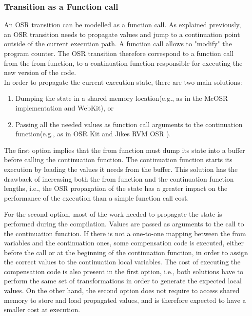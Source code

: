 \subsubsection{Transition as a Function call}
An OSR transition can be modelled as a function call.
As explained previously, an OSR transition needs to propagate values and jump to a continuation point outside of the current execution path.
A function call allows to "modify" the program counter.
The OSR transition therefore correspond to a function call from the from function, to a continuation function responsible for executing the new version of the code.\\

In order to propagate the current execution state, there are two main solutions: 
\begin{enumerate}
    \item Dumping the state in a shared memory location(e.g., as in the McOSR implementation\cite{lameed2013modular} and WebKit\cite{WebKitURL}), or
    \item Passing all the needed values as function call arguments to the continuation function(e.g., as in OSR Kit\cite{OSRKit} and Jikes RVM OSR \cite{fink2003design}).
\end{enumerate}

The first option implies that the from function must dump its state into a buffer before calling the continuation function.
The continuation function starts its execution by loading the values it needs from the buffer.
This solution has the drawback of increasing both the from function and the continuation function lengths, i.e., the OSR propagation of the state has a greater impact on the performance of the execution than a simple function call cost.\\


For the second option, most of the work needed to propagate the state is performed during the compilation.
Values are passed as arguments to the call to the continuation function.
If there is not a one-to-one mapping between the from variables and the continuation ones, some compensation code is executed, either before the call or at the beginning of the continuation function, in order to assign the correct values to the continuation local variables.
The cost of executing the compensation code is also present in the first option, i.e., both solutions have to perform the same set of transformations in order to generate the expected local values.
On the other hand, the second option does not require to access shared memory to store and load propagated values, and is therefore expected to have a smaller cost at execution.\\
\begin{minipage}{\linewidth}
\end{minipage}


